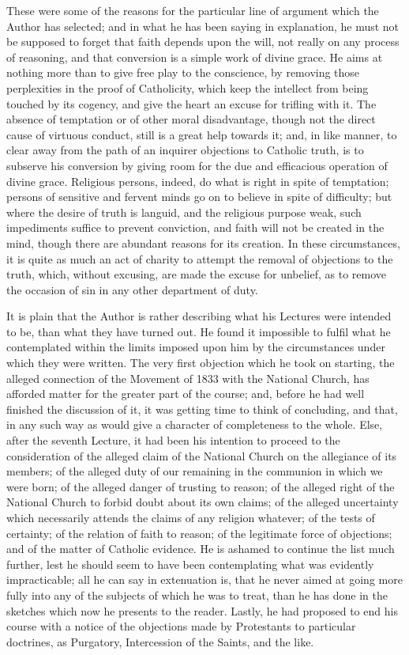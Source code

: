 These were some of the reasons for the particular line of argument
which the Author has selected; and in what he has been saying in
explanation, he must not be supposed to forget that faith depends upon
the will, not really on any process of reasoning, and that conversion
is a simple work of divine grace. He aims at nothing more than to give
free play to the conscience, by removing those perplexities in the
proof of Catholicity, which keep the intellect from being touched by
its cogency, and give the heart an excuse for trifling with it. The
absence of temptation or of other moral disadvantage, though not the
direct cause of virtuous conduct, still is a great help towards it;
and, in like manner, to clear away from the path of an inquirer
objections to Catholic truth, is to subserve his conversion by giving
room for the due and efficacious operation of divine grace. Religious
persons, indeed, do what is right in spite of temptation; persons of
sensitive and fervent minds go on to believe in spite of difficulty;
but where the desire of truth is languid, and the religious purpose
weak, such impediments suffice to prevent conviction, and faith will
not be created in the mind, though there are abundant reasons for its
creation. In these circumstances, it is quite as much an act of
charity to attempt the removal of objections to the truth, which,
without excusing, are made the excuse for unbelief, as to remove the
occasion of sin in any other department of duty.

It is plain that the Author is rather describing what his Lectures
were intended to be, than what they have turned out. He found it
impossible to fulfil what he contemplated within the limits imposed
upon him by the circumstances under which they were written. The very
first objection which he took on starting, the alleged connection of
the Movement of 1833 with the National Church, has afforded matter for
the greater part of the course; and, before he had well finished the
discussion of it, it was getting time to think of concluding, and
that, in any such way as would give a character of completeness to the
whole. Else, after the seventh Lecture, it had been his intention to
proceed to the consideration of the alleged claim of the National
Church on the allegiance of its members; of the alleged duty of our
remaining in the communion in which we were born; of the alleged
danger of trusting to reason; of the alleged right of the National
Church to forbid doubt about its own claims; of the alleged
uncertainty which necessarily attends the claims of any religion
whatever; of the tests of certainty; of the relation of faith to
reason; of the legitimate force of objections; and of the matter of
Catholic evidence. He is ashamed to continue the list much further,
lest he should seem to have been contemplating what was evidently
impracticable; all he can say in extenuation is, that he never aimed
at going more fully into any of the subjects of which he was to treat,
than he has done in the sketches which now he presents to the reader.
Lastly, he had proposed to end his course with a notice of the
objections made by Protestants to particular doctrines, as Purgatory,
Intercession of the Saints, and the like.

